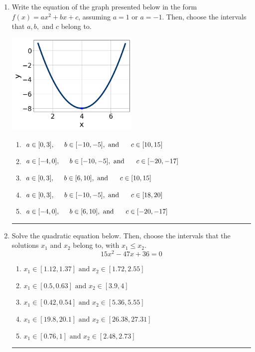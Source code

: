 \documentclass[14pt]{extbook}
\newcommand{\litem}[1]{\item#1\hspace*{-1cm}\rule{\textwidth}{0.4pt}}
\begin{document}
\begin{enumerate}
{\begin{enumerate}[label=\Alph*.]
\end{enumerate} }
\litem{
Write the equation of the graph presented below in the form $f(x)=ax^2+bx+c$, assuming  $a=1$ or $a=-1$. Then, choose the intervals that $a, b,$ and $c$ belong to.
\begin{center}
    \includegraphics[width=0.5\textwidth]{../Figures/quadraticGraphToEquationCopyA.png}
\end{center}
\begin{enumerate}[label=\Alph*.]
\item \( a \in [0, 3], \hspace*{5mm} b \in [-10, -5], \text{ and } \hspace*{5mm} c \in [10, 15] \)
\item \( a \in [-4, 0], \hspace*{5mm} b \in [-10, -5], \text{ and } \hspace*{5mm} c \in [-20, -17] \)
\item \( a \in [0, 3], \hspace*{5mm} b \in [6, 10], \text{ and } \hspace*{5mm} c \in [10, 15] \)
\item \( a \in [0, 3], \hspace*{5mm} b \in [-10, -5], \text{ and } \hspace*{5mm} c \in [18, 20] \)
\item \( a \in [-4, 0], \hspace*{5mm} b \in [6, 10], \text{ and } \hspace*{5mm} c \in [-20, -17] \)

\end{enumerate} }
\litem{
Solve the quadratic equation below. Then, choose the intervals that the solutions $x_1$ and $x_2$ belong to, with $x_1 \leq x_2$.\[ 15x^{2} -47 x + 36 = 0 \]\begin{enumerate}[label=\Alph*.]
\item \( x_1 \in [1.12, 1.37] \text{ and } x_2 \in [1.72, 2.55] \)
\item \( x_1 \in [0.5, 0.63] \text{ and } x_2 \in [3.9, 4] \)
\item \( x_1 \in [0.42, 0.54] \text{ and } x_2 \in [5.36, 5.55] \)
\item \( x_1 \in [19.8, 20.1] \text{ and } x_2 \in [26.38, 27.31] \)
\item \( x_1 \in [0.76, 1] \text{ and } x_2 \in [2.48, 2.73] \)


\end{enumerate}}
\end{enumerate}
\end{document}
